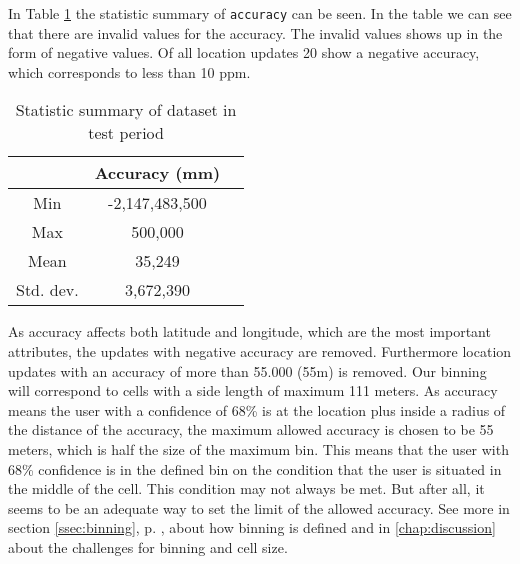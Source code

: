 In Table \ref{tab:stat_geo_p1} the statistic summary of \texttt{accuracy} can be seen. 
In the table we can see that there are invalid values for the accuracy. The invalid values shows up in the form of negative values. 
Of all location updates 20 show a negative accuracy, which corresponds to less than 10 ppm.  


\begin{table}[H]
        \centering
        \small
        \setlength\tabcolsep{2pt}
        \begin{tabular}{|c|c|c|}
            \hline
                         & Accuracy (mm)          \\[0pt]
            \hline
                 Min     &  -2,147,483,500             \\
            \hline
                 Max     &  500,000                \\
            \hline
                 Mean    & 35,249                      \\
            \hline
                Std. dev.   & 3,672,390                \\
            \hline
        \end{tabular}
        \caption{Statistic summary of dataset in test period}
        \label{tab:stat_geo_p1}
\end{table}

As accuracy affects both latitude and longitude, which are the most important attributes, the updates with negative accuracy are removed. Furthermore location updates with an accuracy of more than 55.000 (55m) is removed. Our binning will correspond to cells with a side length of maximum 111 meters. As accuracy means the user with a confidence of 68\% is at the location plus inside a radius of the distance of the accuracy, the maximum allowed accuracy is chosen to be 55 meters, which is half the size of the maximum bin. This means that the user with 68\% confidence is in the defined bin on the condition that the user is situated in the middle of the cell. This condition may not always be met. But after all, it seems to be an adequate way to set the limit of the allowed accuracy. 
See more in section \ref{ssec:binning}, p. \pageref{ssec:binning}, about how binning is defined and in \autoref{chap:discussion} about the challenges for binning and cell size. 

